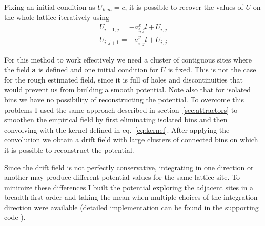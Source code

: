 \documentclass[a4paper]{article}
\begin{document}
Fixing an initial condition as $U_{k,m} = c$, it is possible to recover the values of $U$ on the whole lattice iteratively using
\begin{align}
U_{i+1,j} = -a^x_{i,j}l + U_{i,j} \\[10pt]
U_{i,j+1} = -a^y_{i,j}l + U_{i,j}
\end{align}

For this method to work effectively we need a cluster of contiguous sites where the field $\bm{a}$ is defined and one initial condition for $U$ is fixed. This is not the case for the rough estimated field, since it is full of holes and discontinuities that would prevent us from building a smooth potential. Note also that for isolated bins we have no possibility of reconstructing the potential. To overcome this problems I used the same approach described in section~\ref{sec:attractors} to smoothen the empirical field by first eliminating isolated bins and then convolving with the kernel defined in eq.~\ref{eq:kernel}. After applying the convolution we obtain a drift field with large clusters of connected bins on which it is possible to reconstruct the potential.

Since the drift field is not perfectly conservative, integrating in one direction or another may produce different potential values for the same lattice site. To minimize these differences I built the potential exploring the adjacent sites in a breadth first order and taking the mean when multiple choices of the integration direction were available (detailed implementation can be found in the supporting code \cite{code}).
\end{document}
